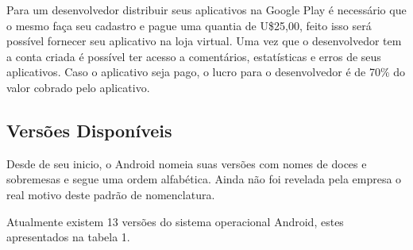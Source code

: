 Para um desenvolvedor distribuir seus aplicativos na Google Play é necessário que o mesmo faça seu cadastro e pague uma quantia de U\$25,00, feito isso será possível fornecer seu aplicativo na loja virtual. Uma vez que o desenvolvedor tem a conta criada é possível ter acesso a comentários, estatísticas e erros de seus aplicativos. Caso o aplicativo seja pago, o lucro para o desenvolvedor é de 70\% do valor cobrado pelo aplicativo. \cite{tt}

\subsection{Versões Disponíveis}

Desde de seu inicio, o Android nomeia suas versões com nomes de doces e sobremesas e segue uma ordem alfabética. Ainda não foi revelada pela empresa o real motivo deste padrão de nomenclatura.

Atualmente existem 13 versões do sistema operacional Android, estes apresentados na tabela 1. \cite{vs}

\begin{table}[h!]
\end{table}
\pagebreak
